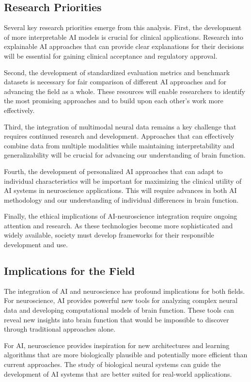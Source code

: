 \documentclass[conference]{IEEEtran}
\begin{document}
\subsection{Research Priorities}

Several key research priorities emerge from this analysis. First, the development of more interpretable AI models is crucial for clinical applications. Research into explainable AI approaches that can provide clear explanations for their decisions will be essential for gaining clinical acceptance and regulatory approval.

Second, the development of standardized evaluation metrics and benchmark datasets is necessary for fair comparison of different AI approaches and for advancing the field as a whole. These resources will enable researchers to identify the most promising approaches and to build upon each other's work more effectively.

Third, the integration of multimodal neural data remains a key challenge that requires continued research and development. Approaches that can effectively combine data from multiple modalities while maintaining interpretability and generalizability will be crucial for advancing our understanding of brain function.

Fourth, the development of personalized AI approaches that can adapt to individual characteristics will be important for maximizing the clinical utility of AI systems in neuroscience applications. This will require advances in both AI methodology and our understanding of individual differences in brain function.

Finally, the ethical implications of AI-neuroscience integration require ongoing attention and research. As these technologies become more sophisticated and widely available, society must develop frameworks for their responsible development and use.

\subsection{Implications for the Field}

The integration of AI and neuroscience has profound implications for both fields. For neuroscience, AI provides powerful new tools for analyzing complex neural data and developing computational models of brain function. These tools can reveal new insights into brain function that would be impossible to discover through traditional approaches alone.

For AI, neuroscience provides inspiration for new architectures and learning algorithms that are more biologically plausible and potentially more efficient than current approaches. The study of biological neural systems can guide the development of AI systems that are better suited for real-world applications.
\end{document}
